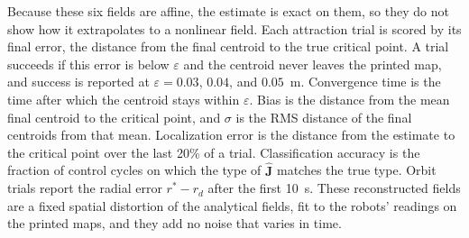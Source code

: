 %
Because these six fields are affine, the estimate is exact on them, so they do not show how it extrapolates to a nonlinear field.
%
Each attraction trial is scored by its final error, the distance from the final centroid to the true critical point. A trial succeeds if this error is below $\varepsilon$ and the centroid never leaves the printed map, and success is reported at $\varepsilon = 0.03$, $0.04$, and $0.05$~m. Convergence time is the time after which the centroid stays within $\varepsilon$. Bias is the distance from the mean final centroid to the critical point, and $\sigma$ is the RMS distance of the final centroids from that mean. Localization error is the distance from the estimate to the critical point over the last 20\% of a trial. Classification accuracy is the fraction of control cycles on which the type of $\hat{\mathbf{J}}$ matches the true type. Orbit trials report the radial error $r^* - r_d$ after the first 10~s.
%
These reconstructed fields are a fixed spatial distortion of the analytical fields, fit to the robots' readings on the printed maps, and they add no noise that varies in time.
%
